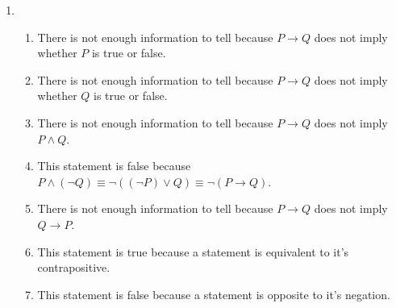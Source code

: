 \documentclass{article}
\begin{document}
\begin{enumerate}
\item
\begin{enumerate}
    \item 
    There is not enough information to tell because $P \rightarrow Q$ does not imply whether $P$ is true or false.
    \item 
    There is not enough information to tell because $P \rightarrow Q$ does not imply whether $Q$ is true or false.
    \item 
    There is not enough information to tell because $P \rightarrow Q$ does not imply $P \wedge Q$.
    \item 
    This statement is false because $P \wedge (\neg Q) \equiv \neg ((\neg P) \vee Q) \equiv \neg(P \rightarrow Q)$.
    \item 
    There is not enough information to tell because $P \rightarrow Q$ does not imply $Q \rightarrow P$.
    \item 
    This statement is true because a statement is equivalent to it's contrapositive. 
    \item 
    This statement is false because a statement is opposite to it's negation. 
\end{enumerate}
    
\end{enumerate}
\end{document}
